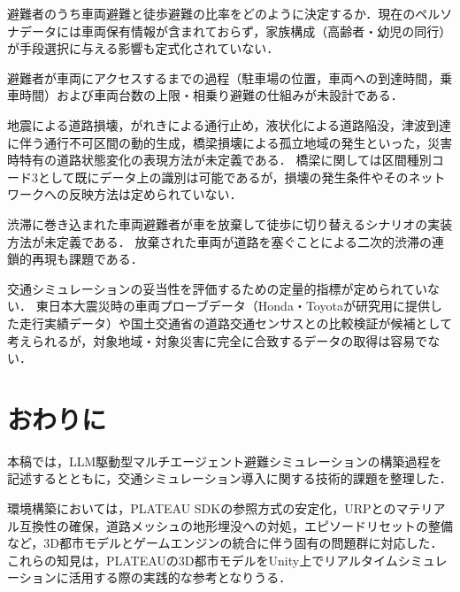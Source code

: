\documentclass[a4paper,11pt]{jsarticle}
\begin{document}
\begin{description}[leftmargin=2em, style=nextline]
  \item[避難手段の選択基準]
  避難者のうち車両避難と徒歩避難の比率をどのように決定するか．現在のペルソナデータには車両保有情報が含まれておらず，家族構成（高齢者・幼児の同行）が手段選択に与える影響も定式化されていない．

  \item[車両の空間的配置]
  避難者が車両にアクセスするまでの過程（駐車場の位置，車両への到達時間，乗車時間）および車両台数の上限・相乗り避難の仕組みが未設計である．

  \item[災害による道路の損壊・閉塞]
  地震による道路損壊，がれきによる通行止め，液状化による道路陥没，津波到達に伴う通行不可区間の動的生成，橋梁損壊による孤立地域の発生といった，災害時特有の道路状態変化の表現方法が未定義である．
  橋梁に関しては区間種別コード3として既にデータ上の識別は可能であるが，損壊の発生条件やそのネットワークへの反映方法は定められていない．

  \item[避難手段の動的切替]
  渋滞に巻き込まれた車両避難者が車を放棄して徒歩に切り替えるシナリオの実装方法が未定義である．
  放棄された車両が道路を塞ぐことによる二次的渋滞の連鎖的再現も課題である．

  \item[検証指標の特定]
  交通シミュレーションの妥当性を評価するための定量的指標が定められていない．
  東日本大震災時の車両プローブデータ（Honda・Toyotaが研究用に提供した走行実績データ）や国土交通省の道路交通センサスとの比較検証が候補として考えられるが，対象地域・対象災害に完全に合致するデータの取得は容易でない．
\end{description}

\section{おわりに}

本稿では，LLM駆動型マルチエージェント避難シミュレーションの構築過程を記述するとともに，交通シミュレーション導入に関する技術的課題を整理した．

環境構築においては，PLATEAU SDKの参照方式の安定化，URPとのマテリアル互換性の確保，道路メッシュの地形埋没への対処，エピソードリセットの整備など，3D都市モデルとゲームエンジンの統合に伴う固有の問題群に対応した．
これらの知見は，PLATEAUの3D都市モデルをUnity上でリアルタイムシミュレーションに活用する際の実践的な参考となりうる．
\end{document}
